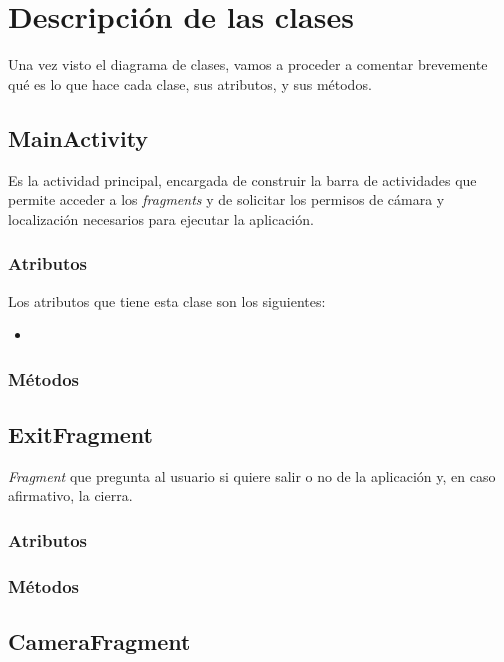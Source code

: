 \documentclass[11pt,a4paper]{article}
\begin{document}
\section{Descripción de las clases}

Una vez visto el diagrama de clases, vamos a proceder a comentar brevemente qué es lo que hace cada clase, sus
atributos, y sus métodos.

\subsection{\textbf{MainActivity}}
\label{sec:main}

Es la actividad principal, encargada de construir la barra de actividades que permite acceder
a los \textit{fragments} y de solicitar los permisos de cámara y localización necesarios para ejecutar
la aplicación.

\subsubsection{Atributos}

Los atributos que tiene esta clase son los siguientes:

\begin{itemize}
    \item 
\end{itemize}

\subsubsection{Métodos}


\subsection{\textbf{ExitFragment}}
\label{sec:exit}

\textit{Fragment} que pregunta al usuario si quiere salir o no de la aplicación y, en caso afirmativo, la cierra.

\subsubsection{Atributos}

\subsubsection{Métodos}

\subsection{\textbf{CameraFragment}}
\label{sec:camera}
\end{document}
